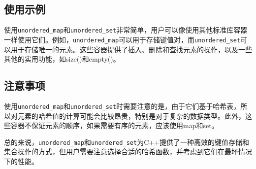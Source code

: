 \documentclass[12pt]{article}
\begin{document}
\subsection{使用示例}
使用\texttt{unordered\_map}和\texttt{unordered\_set}非常简单，用户可以像使用其他标准库容器一样使用它们。例如，\texttt{unordered\_map}可以用于存储键值对，而\texttt{unordered\_set}可以用于存储唯一的元素。这些容器提供了插入、删除和查找元素的操作，以及一些其他的实用功能，如size()和empty()。

\subsection{注意事项}
使用\texttt{unordered\_map}和\texttt{unordered\_set}时需要注意的是，由于它们基于哈希表，所以对元素的哈希值的计算可能会比较昂贵，特别是对于复杂的数据类型。此外，这些容器不保证元素的顺序，如果需要有序的元素，应该使用map和set。

总的来说，\texttt{unordered\_map}和\texttt{unordered\_set}为C++提供了一种高效的键值存储和集合操作的方式，但用户需要注意选择合适的哈希函数，并考虑到它们在最坏情况下的性能。
\end{document}
